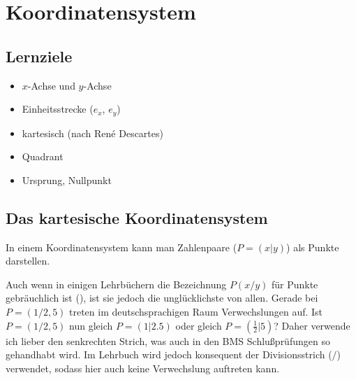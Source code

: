 
\section{Koordinatensystem}
\subsection*{Lernziele}

\begin{itemize}
\item $x$-Achse und $y$-Achse
\item Einheitsstrecke ($e_x$, $e_y$)
\item kartesisch (nach René Descartes)
\item Quadrant 
\item Ursprung, Nullpunkt
\end{itemize}


\subsection{Das kartesische Koordinatensystem}
In einem Koordinatensystem kann man Zahlenpaare ($P=(x|y)$) als Punkte
darstellen.

\begin{bemerkung}{}{}
  Auch wenn in einigen Lehrbüchern die Bezeichnung $P(x/y)$ für Punkte gebräuchlich ist (\cite{frommenwiler17alg}), ist
  sie jedoch die unglücklichste von allen. Gerade bei $P=(1/2,5)$
  treten im deutschsprachigen Raum Verwechslungen auf. Ist $P=(1/2,5)$
  nun gleich $P=(1 | 2.5)$ oder gleich $P=(\frac{1}{2} | 5)$?
  Daher verwende ich lieber den senkrechten Strich, was auch in den
  BMS Schlußprüfungen so gehandhabt wird. Im Lehrbuch wird jedoch
  konsequent der Divisionsstrich ($/$) verwendet, sodass hier auch
  keine Verwechslung auftreten kann.
\end{bemerkung}
\newpage

